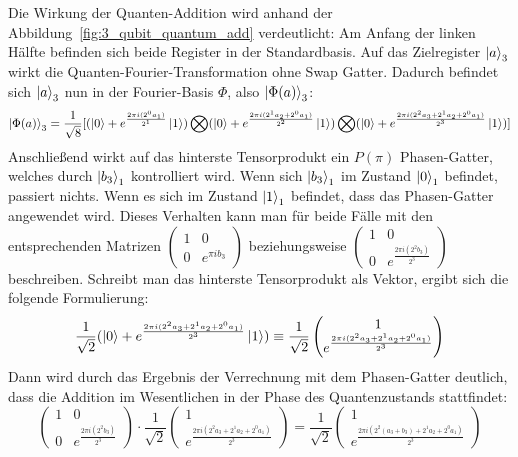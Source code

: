 Die Wirkung der Quanten-Addition wird anhand der Abbildung~\ref*{fig:3_qubit_quantum_add} verdeutlicht:
Am Anfang der linken Hälfte befinden sich beide Register in der Standardbasis.
Auf das Zielregister \(\ket{a}_3\) wirkt die Quanten-Fourier-Transformation ohne Swap Gatter.
Dadurch befindet sich \(\ket{a}_3\) nun in der Fourier-Basis \(\Phi\), also \(\ket{\Phi(a)}_3\):
\[\ket{\Phi(a)}_3 = \frac{1}{\sqrt{8}} [ (\ket{0} + { e^{\frac{2 \pi i (2^0a_1)}{2^1}}}\ket{1} ) \bigotimes
( \ket{0} + { e^{\frac{2 \pi i (2^1a_2+2^0a_1)}{2^2}}}\ket{1} ) \bigotimes
( \ket{0} + { e^{\frac{2 \pi i (2^{2}a_3 +2^1a_2+2^0a_1)}{2^3}}}\ket{1} ) ] \]
Anschließend wirkt auf das hinterste Tensorprodukt ein \(P(\pi)\) Phasen-Gatter,
welches durch \(\ket{b_3}_1\) kontrolliert wird.
Wenn sich \(\ket{b_3}_1\) im Zustand \(\ket{0}_1\) befindet, passiert nichts.
Wenn es sich im Zustand \(\ket{1}_1\) befindet, dass das Phasen-Gatter angewendet wird.
Dieses Verhalten kann man für beide Fälle mit den entsprechenden Matrizen 
\(\begin{pmatrix}
    1 & 0 \\
    0 & e^{\pi i b_3}
  \end{pmatrix}\)
  beziehungsweise  
  \(\begin{pmatrix}
    1 & 0 \\
    0 & e^{\frac{2\pi i (2^2b_3)}{2^3}}
  \end{pmatrix}\)
beschreiben.
Schreibt man das hinterste Tensorprodukt als Vektor, ergibt sich die folgende Formulierung:
\[\frac{1}{\sqrt{2}}( \ket{0} + { e^{\frac{2 \pi i (2^{2}a_3 +2^1a_2+2^0a_1)}{2^3}}}\ket{1}) \equiv
\frac{1}{\sqrt{2}}
\begin{pmatrix}
     1  \\
     e^{\frac{2 \pi i (2^{2}a_3 +2^1a_2+2^0a_1)}{2^3}}
  \end{pmatrix}
    \]
Dann wird durch das Ergebnis der Verrechnung mit dem Phasen-Gatter deutlich, 
dass die Addition im Wesentlichen in der Phase des Quantenzustands stattfindet:
\[\begin{pmatrix}
    1 & 0 \\
    0 & e^{\frac{2\pi i (2^2b_3)}{2^3}}
  \end{pmatrix}
    \cdot
\frac{1}{\sqrt{2}}
\begin{pmatrix}
    1  \\
     e^{\frac{2 \pi i (2^{2}a_3 +2^1a_2+2^0a_1)}{2^3}}
  \end{pmatrix}
  =
  \frac{1}{\sqrt{2}}
  \begin{pmatrix}
    1  \\
     e^{\frac{2 \pi i (2^{2}(a_3+b_3) +2^1a_2+2^0a_1)}{2^3}}
  \end{pmatrix}
\]
